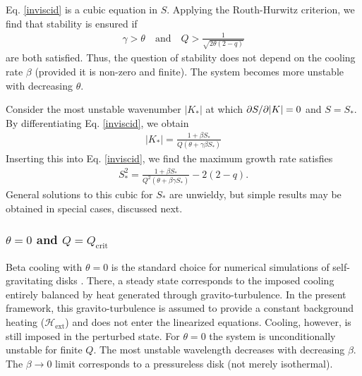 Eq. \ref{inviscid} is a cubic equation in $S$. Applying the
Routh-Hurwitz criterion, we find that stability is ensured if 
\begin{align}
  \gamma > \theta \quad \text{and} \quad 
  Q > \frac{1}{\sqrt{2\theta(2-q)}} 
\end{align}
are both satisfied. Thus, the question of stability does not depend on
the cooling rate $\beta$ (provided it is non-zero and finite). The
system becomes more unstable with decreasing $\theta$.   

Consider the most unstable wavenumber $|K_*|$ at which $\partial S/\partial |K| =
0$ and $S = 
S_*$. By differentiating Eq. \ref{inviscid}, we obtain 
\begin{align}\label{kstar}
  |K_*| = \frac{1+\beta S_*}{Q\left(\theta + \gamma \beta S_*\right)}
\end{align}
Inserting this into Eq. \ref{inviscid}, we find the maximum growth
rate satisfies
\begin{align}\label{inviscid_max}
  S_*^2 = \frac{1+\beta S_*}{Q^2\left(\theta + \beta\gamma S_*\right)}
  - 2(2-q).
\end{align}
General solutions to this cubic for $S_*$ are unwieldy, but simple
results may be obtained in special cases, discussed next. 

\subsubsection{$\theta = 0$ and $Q=Q_\mathrm{crit}$}  
Beta cooling with $\theta=0$ is the standard choice for numerical
simulations of self-gravitating disks \citep{gammie01}. There, 
a steady state corresponds to the imposed cooling entirely balanced by heat generated through 
gravito-turbulence. In the present framework, this gravito-turbulence 
is assumed to provide a constant 
background heating ($\mathcal{H}_\mathrm{ext}$) and does
not enter the linearized equations. Cooling, however, is still imposed in the perturbed state. 
For $\theta=0$ the system is unconditionally unstable for
finite $Q$. The most unstable wavelength decreases with decreasing
$\beta$. The $\beta\to0$ limit corresponds to a pressureless disk (not
merely isothermal).   

